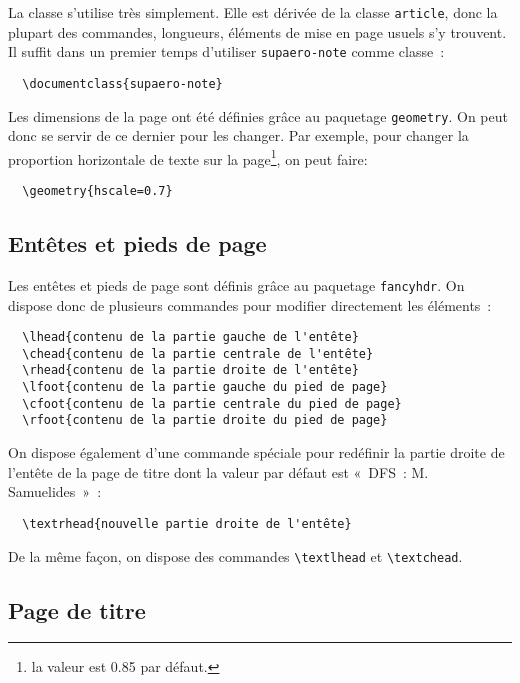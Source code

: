\documentclass[french]{supaero-note}
\begin{document}
La classe s'utilise très simplement. Elle est dérivée de la classe
\texttt{article}, donc la plupart des commandes, longueurs, éléments
de mise en page usuels s'y trouvent. Il suffit dans un premier temps
d'utiliser \texttt{supaero-note} comme classe~:

\begin{verbatim}
  \documentclass{supaero-note}
\end{verbatim}

Les dimensions de la page ont été définies grâce au paquetage
\texttt{geometry}. On peut donc se servir de ce dernier pour les
changer. Par exemple, pour changer la proportion horizontale de texte
sur la page\footnote{la valeur est 0.85 par défaut.}, on peut faire:

\begin{verbatim}
  \geometry{hscale=0.7}
\end{verbatim}

\subsection{Entêtes et pieds de page}
\label{sec:entetes-et-pieds}

Les entêtes et pieds de page sont définis grâce au paquetage
\texttt{fancyhdr}. On dispose donc de plusieurs commandes pour
modifier directement les éléments~:

\begin{verbatim}
  \lhead{contenu de la partie gauche de l'entête}
  \chead{contenu de la partie centrale de l'entête}
  \rhead{contenu de la partie droite de l'entête}
  \lfoot{contenu de la partie gauche du pied de page}
  \cfoot{contenu de la partie centrale du pied de page}
  \rfoot{contenu de la partie droite du pied de page}
\end{verbatim}

On dispose également d'une commande spéciale pour redéfinir la partie
droite de l'entête de la page de titre dont la valeur par défaut est
«~DFS~: M. Samuelides~»~:

\begin{verbatim}
  \textrhead{nouvelle partie droite de l'entête}
\end{verbatim}

De la même façon, on dispose des commandes \verb!\textlhead! et
\verb!\textchead!.

\subsection{Page de titre}
\label{sec:page-de-titre}
\end{document}
